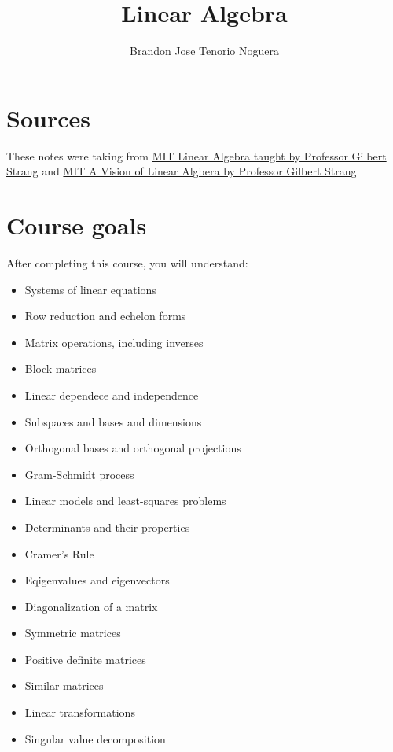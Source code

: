 \documentclass[12pt]{article}
\title{\textbf{Linear Algebra}}
\author{Brandon Jose Tenorio Noguera}
\begin{document}
\begin{titlingpage}
\maketitle
\end{titlingpage}

\tableofcontents
\newpage

\section{Sources}\label{srcs}
\begin{tcolorbox}[title=Sources]
These notes were taking from \href{https://ocw.mit.edu/courses/18-06sc-linear-algebra-fall-2011/pages/syllabus/}{MIT Linear Algebra taught by Professor Gilbert Strang} and \href{https://ocw.mit.edu/courses/res-18-010-a-2020-vision-of-linear-algebra-spring-2020/}{MIT A Vision of Linear Algbera by Professor Gilbert Strang}
\end{tcolorbox}

\section{Course goals}\label{}

After completing this course, you will understand:
\begin{itemize}
  \item Systems of linear equations
  \item Row reduction and echelon forms
  \item Matrix operations, including inverses
  \item Block matrices
  \item Linear dependece and independence
  \item Subspaces and bases and dimensions
  \item Orthogonal bases and orthogonal projections
  \item Gram-Schmidt process
  \item Linear models and least-squares problems
  \item Determinants and their properties
  \item Cramer's Rule
  \item Eqigenvalues and eigenvectors
  \item Diagonalization of a matrix
  \item Symmetric matrices
  \item Positive definite matrices
  \item Similar matrices
  \item Linear transformations
  \item Singular value decomposition
  
\end{itemize}
\end{document}
